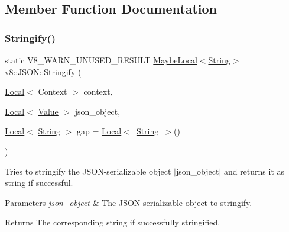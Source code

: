 \subsection{Member Function Documentation}
\mbox{\label{classv8_1_1JSON_ac5ddb9edc1369a7d889b7ac8411e7b71}} 
\subsubsection{\texorpdfstring{Stringify()}{Stringify()}}
{\footnotesize\ttfamily static V8\+\_\+\+W\+A\+R\+N\+\_\+\+U\+N\+U\+S\+E\+D\+\_\+\+R\+E\+S\+U\+LT \mbox{\hyperlink{classv8_1_1MaybeLocal}{Maybe\+Local}}$<$\mbox{\hyperlink{classv8_1_1String}{String}}$>$ v8\+::\+J\+S\+O\+N\+::\+Stringify (\begin{DoxyParamCaption}\item[{\mbox{\hyperlink{classv8_1_1Local}{Local}}$<$ Context $>$}]{context,  }\item[{\mbox{\hyperlink{classv8_1_1Local}{Local}}$<$ \mbox{\hyperlink{classv8_1_1Value}{Value}} $>$}]{json\+\_\+object,  }\item[{\mbox{\hyperlink{classv8_1_1Local}{Local}}$<$ \mbox{\hyperlink{classv8_1_1String}{String}} $>$}]{gap = {\ttfamily \mbox{\hyperlink{classv8_1_1Local}{Local}}$<$~\mbox{\hyperlink{classv8_1_1String}{String}}~$>$()} }\end{DoxyParamCaption})\hspace{0.3cm}{\ttfamily [static]}}

Tries to stringify the J\+S\+O\+N-\/serializable object $\vert$json\+\_\+object$\vert$ and returns it as string if successful.


\begin{DoxyParams}{Parameters}
{\em json\+\_\+object} & The J\+S\+O\+N-\/serializable object to stringify. \\
\hline
\end{DoxyParams}
\begin{DoxyReturn}{Returns}
The corresponding string if successfully stringified. 
\end{DoxyReturn}
\mbox{\label{classv8_1_1JSON_acc5421b3e5d85d3788a1e6cb59403393}} 
